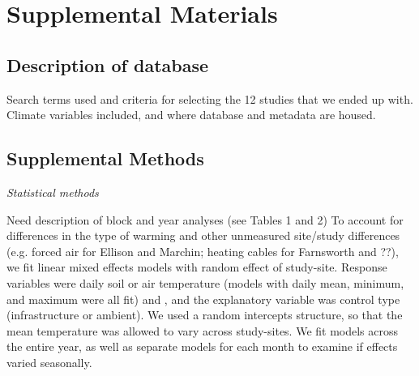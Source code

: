 \documentclass{article}
\begin{document}
\section*{Supplemental Materials}
\subsection*{Description of database}
Search terms used and criteria for selecting the 12 studies that we ended up with. Climate variables included, and where database and metadata are housed.
\subsection*{Supplemental Methods}
\par\textit{Statistical methods}
\par Need description of block and year analyses (see Tables 1 and 2) 
To account for differences in the type of warming and other unmeasured site/study differences (e.g. forced air for Ellison and Marchin; heating cables for Farnsworth and ??), we fit linear mixed effects models with random effect of study-site. Response variables were daily soil or air temperature (models with daily  mean, minimum, and maximum were all fit) and , and the explanatory variable was control type (infrastructure or ambient). We used a random intercepts structure, so that the mean temperature was allowed to vary across study-sites. We fit models across the entire year, as well as separate models for each month to examine if effects varied seasonally.
\end{document}
